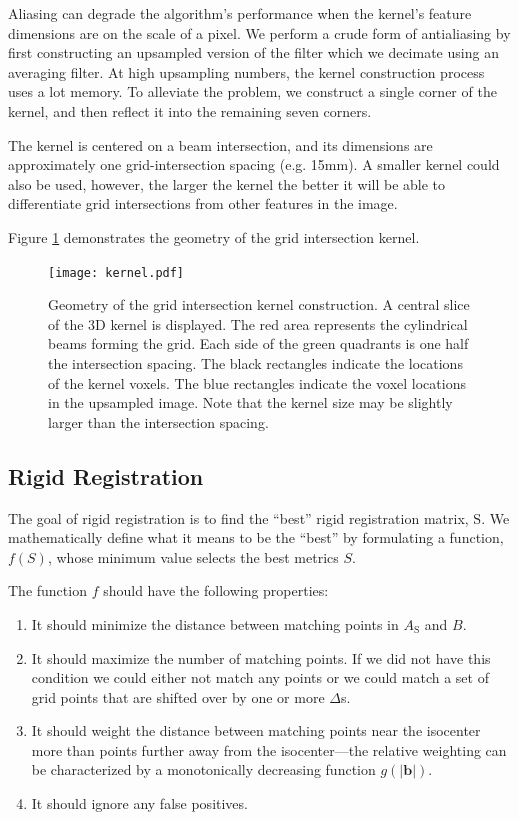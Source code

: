 \documentclass[12pt]{article}
\begin{document}
Aliasing can degrade the algorithm's performance when the kernel's feature dimensions are on the scale of a pixel.  We perform a crude form of antialiasing by first constructing an upsampled version of the filter which we decimate using an averaging filter.  At high upsampling numbers, the kernel construction process uses a lot memory.  To alleviate the problem, we construct a single corner of the kernel, and then reflect it into the remaining seven corners.

The kernel is centered on a beam intersection, and its dimensions are approximately one grid-intersection spacing (e.g. 15mm).  A smaller kernel could also be used, however, the larger the kernel the better it will be able to differentiate grid intersections from other features in the image.

Figure \ref{fig:kernel} demonstrates the geometry of the grid intersection kernel.

\begin{figure}
    \centering
    \texttt{[image: kernel.pdf]}
    \caption{Geometry of the grid intersection kernel construction.  A central slice of the 3D kernel is displayed.  The red area represents the cylindrical beams forming the grid.  Each side of the green quadrants is one half the intersection spacing.  The black rectangles indicate the locations of the kernel voxels.  The blue rectangles indicate the voxel locations in the upsampled image.  Note that the kernel size may be slightly larger than the intersection spacing.}
    \label{fig:kernel}
\end{figure}

\subsection{Rigid Registration}

The goal of rigid registration is to find the ``best'' rigid registration matrix, $\textrm{S}$.  We mathematically define what it means to be the ``best'' by formulating a function, $f(S)$, whose minimum value selects the best metrics $S$.

The function $f$ should have the following properties:

\begin{enumerate}
\item It should minimize the distance between matching points in $A_\mathrm{S}$ and $B$.
\item It should maximize the number of matching points.  If we did not have this condition we could either not match any points or we could match a set of grid points that are shifted over by one or more $\Delta$s.
\item It should weight the distance between matching points near the isocenter more than points further away from the isocenter---the relative weighting can be characterized by a monotonically decreasing function $g(|\mathbf{b}|)$.
\item It should ignore any false positives.
\end{enumerate}
\end{document}
